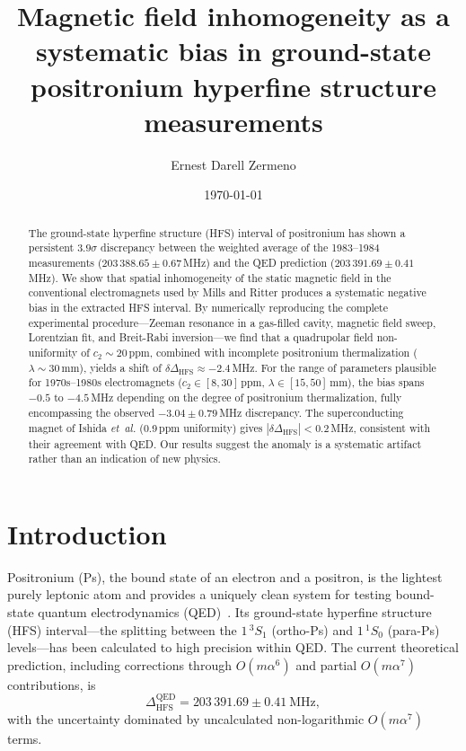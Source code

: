 \documentclass[twocolumn,pra,aps,superscriptaddress,floatfix,10pt]{revtex4-2}
\begin{document}
\title{Magnetic field inhomogeneity as a systematic bias in ground-state positronium hyperfine structure measurements}

\author{Ernest Darell Zermeno}

\date{\today}

\begin{abstract}
The ground-state hyperfine structure (HFS) interval of positronium has shown a persistent $3.9\sigma$ discrepancy between the weighted average of the 1983--1984 measurements ($203\,388.65 \pm 0.67$\,MHz) and the QED prediction ($203\,391.69 \pm 0.41$\,MHz). We show that spatial inhomogeneity of the static magnetic field in the conventional electromagnets used by Mills and Ritter produces a systematic negative bias in the extracted HFS interval. By numerically reproducing the complete experimental procedure---Zeeman resonance in a gas-filled cavity, magnetic field sweep, Lorentzian fit, and Breit-Rabi inversion---we find that a quadrupolar field non-uniformity of $c_2 \sim 20$\,ppm, combined with incomplete positronium thermalization ($\lambda \sim 30$\,mm), yields a shift of $\delta\Delta_\mathrm{HFS} \approx -2.4$\,MHz. For the range of parameters plausible for 1970s--1980s electromagnets ($c_2 \in [8, 30]$\,ppm, $\lambda \in [15, 50]$\,mm), the bias spans $-0.5$ to $-4.5$\,MHz depending on the degree of positronium thermalization, fully encompassing the observed $-3.04 \pm 0.79$\,MHz discrepancy. The superconducting magnet of Ishida \textit{et~al.} (0.9\,ppm uniformity) gives $|\delta\Delta_\mathrm{HFS}| < 0.2$\,MHz, consistent with their agreement with QED. Our results suggest the anomaly is a systematic artifact rather than an indication of new physics.
\end{abstract}

\maketitle

\section{Introduction}
\label{sec:intro}

Positronium (Ps), the bound state of an electron and a positron, is the lightest purely leptonic atom and provides a uniquely clean system for testing bound-state quantum electrodynamics (QED)~\cite{Adkins2022}. Its ground-state hyperfine structure (HFS) interval---the splitting between the $1\,^3S_1$ (ortho-Ps) and $1\,^1S_0$ (para-Ps) levels---has been calculated to high precision within QED. The current theoretical prediction, including corrections through $O(m\alpha^6)$ and partial $O(m\alpha^7)$ contributions, is~\cite{Kniehl2000,Melnikov2001,Baker2014}
\begin{equation}
  \Delta_\mathrm{HFS}^\mathrm{QED} = 203\,391.69 \pm 0.41~\mathrm{MHz},
  \label{eq:qed}
\end{equation}
with the uncertainty dominated by uncalculated non-logarithmic $O(m\alpha^7)$ terms.
\end{document}
